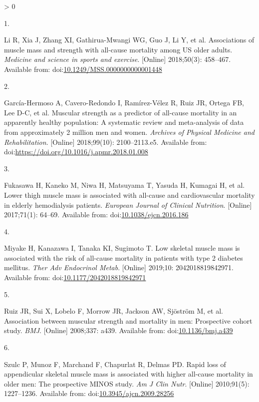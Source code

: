 \documentclass[twoside,10pt]{gihclass} %
\newlength{\cslhangindent}
\newlength{\csllabelwidth}
\newenvironment{CSLReferences}[3] %
 {%
  \setlength{\parindent}{0pt}
  \ifodd #1 \everypar{\setlength{\hangindent}{\cslhangindent}}\ignorespaces\fi
  \ifnum #2 > 0
  \setlength{\parskip}{#2\baselineskip}
  \fi
 }%
 {}
\newcommand{\CSLLeftMargin}[1]{\parbox[t]{\maxof{\widthof{#1}}{\csllabelwidth}}{#1}}
\newcommand{\CSLRightInline}[1]{\parbox[t]{\linewidth}{#1}}
\begin{document}
\hypertarget{refs}{}
\begin{CSLReferences}{0}{0}
\leavevmode\hypertarget{ref-RN2512}{}%
\CSLLeftMargin{1. }
\CSLRightInline{Li R, Xia J, Zhang XI, Gathirua-Mwangi WG, Guo J, Li Y, et al. Associations of muscle mass and strength with all-cause mortality among US older adults. \emph{Medicine and science in sports and exercise}. {[}Online{]} 2018;50(3): 458--467. Available from: doi:\href{https://doi.org/10.1249/MSS.0000000000001448}{10.1249/MSS.0000000000001448}}

\leavevmode\hypertarget{ref-RN2808}{}%
\CSLLeftMargin{2. }
\CSLRightInline{García-Hermoso A, Cavero-Redondo I, Ramírez-Vélez R, Ruiz JR, Ortega FB, Lee D-C, et al. Muscular strength as a predictor of all-cause mortality in an apparently healthy population: A systematic review and meta-analysis of data from approximately 2 million men and women. \emph{Archives of Physical Medicine and Rehabilitation}. {[}Online{]} 2018;99(10): 2100--2113.e5. Available from: doi:\url{https://doi.org/10.1016/j.apmr.2018.01.008}}

\leavevmode\hypertarget{ref-RN2513}{}%
\CSLLeftMargin{3. }
\CSLRightInline{Fukasawa H, Kaneko M, Niwa H, Matsuyama T, Yasuda H, Kumagai H, et al. Lower thigh muscle mass is associated with all-cause and cardiovascular mortality in elderly hemodialysis patients. \emph{European Journal of Clinical Nutrition}. {[}Online{]} 2017;71(1): 64--69. Available from: doi:\href{https://doi.org/10.1038/ejcn.2016.186}{10.1038/ejcn.2016.186}}

\leavevmode\hypertarget{ref-RN2514}{}%
\CSLLeftMargin{4. }
\CSLRightInline{Miyake H, Kanazawa I, Tanaka KI, Sugimoto T. Low skeletal muscle mass is associated with the risk of all-cause mortality in patients with type 2 diabetes mellitus. \emph{Ther Adv Endocrinol Metab}. {[}Online{]} 2019;10: 2042018819842971. Available from: doi:\href{https://doi.org/10.1177/2042018819842971}{10.1177/2042018819842971}}

\leavevmode\hypertarget{ref-RN2809}{}%
\CSLLeftMargin{5. }
\CSLRightInline{Ruiz JR, Sui X, Lobelo F, Morrow JR, Jackson AW, Sjöström M, et al. Association between muscular strength and mortality in men: Prospective cohort study. \emph{BMJ}. {[}Online{]} 2008;337: a439. Available from: doi:\href{https://doi.org/10.1136/bmj.a439}{10.1136/bmj.a439}}

\leavevmode\hypertarget{ref-RN2515}{}%
\CSLLeftMargin{6. }
\CSLRightInline{Szulc P, Munoz F, Marchand F, Chapurlat R, Delmas PD. Rapid loss of appendicular skeletal muscle mass is associated with higher all-cause mortality in older men: The prospective MINOS study. \emph{Am J Clin Nutr}. {[}Online{]} 2010;91(5): 1227--1236. Available from: doi:\href{https://doi.org/10.3945/ajcn.2009.28256}{10.3945/ajcn.2009.28256}}


\end{CSLReferences}
\end{document}
